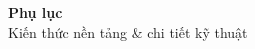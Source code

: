 \documentclass[10pt, aspectratio=169]{beamer}
\begin{document}
\appendix

\begin{frame}[plain]
    \centering
    \vspace{1.5cm}
    {\Huge \textbf{\textcolor{usthblue}{Phụ lục}}}\\[0.6cm]
    {\Large \textcolor{usthdark}{Kiến thức nền tảng \& chi tiết kỹ thuật}}\\[1cm]
    \\[0.5cm]
\end{frame}
\end{document}
